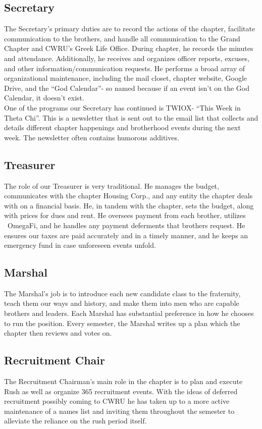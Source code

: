       \subsection*{Secretary}
	The Secretary's primary duties are to record the actions of the chapter, facilitate communication to the brothers, and handle all communication to the Grand Chapter and CWRU's Greek Life Office. During chapter, he records the minutes and attendance. Additionally, he receives and organizes officer reports, excuses, and other information/communication requests. He performs a broad array of organizational maintenance, including the mail closet, chapter website, Google Drive, and the ``God Calendar''- so named because if an event isn't on the God Calendar, it doesn't exist. \\

	One of the programs our Secretary has continued is TWIOX- ``This Week in Theta Chi''. This is a newsletter that is sent out to the email list that collects and details different chapter happenings and brotherhood events during the next week. The newsletter often contains humorous additives.
	
      \subsection*{Treasurer}
	The role of our Treasurer is very traditional. He manages the budget, communicates with the chapter Housing Corp., and any entity the chapter deals with on a financial basis. He, in tandem with the chapter, sets the budget, along with prices for dues and rent. He oversees payment from each brother, utilizes  OmegaFi, and he handles any payment deferments that brothers request. He ensures our taxes are paid accurately and in a timely manner, and he keeps an emergency fund in case unforeseen events unfold. 
      
      \subsection*{Marshal}
	The Marshal's job is to introduce each new candidate class to the fraternity, teach them our ways and history, and make them into men who are capable brothers and leaders. Each Marshal has substantial preference in how he chooses to run the position. Every semester, the Marshal writes up a plan which the chapter then reviews and votes on. 

      \subsection*{Recruitment Chair}
	The Recruitment Chairman's main role in the chapter is to plan and execute Rush as well as organize 365 recruitment events. With the ideas of deferred recruitment possibly coming to CWRU he has taken up to a more active maintenance of a names list and inviting them throughout the semester to alleviate the reliance on the rush period itself.
	
